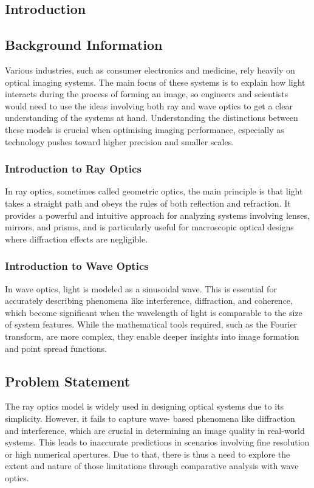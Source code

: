 \begin{multicols}{2}
    \tableofcontents
    \section{Introduction}
    \subsection{Background Information}
    Various industries, such as consumer electronics and medicine, rely heavily on optical imaging systems. 
    The main focus of these systems is to explain how light interacts during the process of forming an image, 
    so engineers and scientists would need to use the ideas involving both ray and wave optics to get a clear 
    understanding of the systems at hand. Understanding the distinctions between these models is crucial when 
    optimising imaging performance, especially as technology pushes toward higher precision and smaller scales.
    \subsubsection{Introduction to Ray Optics}
    In ray optics, sometimes called geometric optics, the main principle is that light takes a straight path and 
    obeys the rules of both reflection and refraction. It provides a powerful and intuitive approach for analyzing 
    systems involving lenses, mirrors, and prisms, and is particularly useful for macroscopic optical designs where 
    diffraction effects are negligible. 
    \subsubsection{Introduction to Wave Optics}
    In wave optics, light is modeled as a sinusoidal wave. This is essential for accurately describing phenomena like 
    interference, diffraction, and coherence, which become significant when the wavelength of light is comparable to 
    the size of system features. While the mathematical tools required, such as the Fourier transform, are more complex,
    they enable deeper insights into image formation and point spread functions. 
    
    \subsection{Problem Statement}
    The ray optics model is widely used in designing optical systems due to its simplicity. However, it fails to capture wave-
    based phenomena like diffraction and interference, which are crucial in determining an image quality in real-world systems. 
    This leads to inaccurate predictions in scenarios involving fine resolution or high numerical apertures. Due to that, there is 
    thus a need to explore the extent and nature of those limitations through comparative analysis with wave optics. 

\end{multicols}
